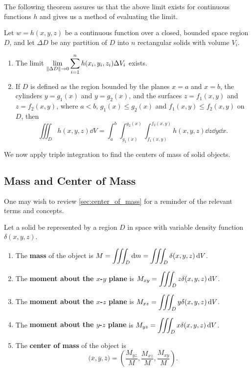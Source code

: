 The following theorem assures us that the above limit exists for continuous functions $h$ and gives us a method of evaluating the limit.

\begin{theorem}\label{thm:triple_integration2}%
Let $w=h(x,y,z)$ be a continuous function over a closed, bounded space region $D$, and let $\Delta D$ be any partition of $D$ into $n$ rectangular solids with volume $V_i$.

\begin{enumerate}
\item		The limit $\displaystyle \lim_{\left\lVert \Delta D \right\rVert\to 0}\sum_{i=1}^n h(x_i,y_i,z_i)\Delta V_i$ exists.

\item		If $D$ is defined as the region bounded by the planes $x=a$ and $x=b$, the cylinders $y=g_1(x)$ and $y=g_2(x)$, and the surfaces $z=f_1(x,y)$ and $z=f_2(x,y)$, where $a<b$, $g_1(x)\leq g_2(x)$ and $f_1(x,y)\leq f_2(x,y)$ on $D$, then
	\[\iiint_D h(x,y,z)\dd V = \int_a^b\int_{g_1(x)}^{g_2(x)}\int_{f_1(x,y)}^{f_2(x,y)} h(x,y,z)\dd z\dd y\dd x.\]
\end{enumerate}
\end{theorem}

We now apply triple integration to find the centers of mass of solid objects.

\subsection{Mass and Center of Mass}

One may wish to review \autoref{sec:center_of_mass} for a reminder of the relevant terms and concepts. 

\begin{definition}\label{def:mass_3d}%
Let a solid be represented by a region $D$ in space with variable density function $\delta(x,y,z)$. 
\begin{enumerate}
	\item The \textbf{mass} of the object is $\displaystyle M= \iiint_D \operatorname{d}\! m=\iiint_D \delta(x,y,z)\operatorname{d}\! V$.
	\item	The \textbf{moment about the $x$-$y$ plane} is $\displaystyle M_{xy}=\iiint_D z\delta(x,y,z)\operatorname{d}\! V$.
	\item	The \textbf{moment about the $x$-$z$ plane} is $\displaystyle M_{xz}=\iiint_D y\delta(x,y,z)\operatorname{d}\! V$.
	\item	The \textbf{moment about the $y$-$z$ plane} is $\displaystyle M_{yz}=\iiint_D x\delta(x,y,z)\operatorname{d}\! V$.
	\item The \textbf{center of mass} of the object is
	\[\bigl(\overline{x},\overline{y},\overline{z}\bigr) = \left(\frac{M_{yz}}M,\frac{M_{xz}}M,\frac{M_{xy}}M\right).\]
\end{enumerate}
\end{definition}

